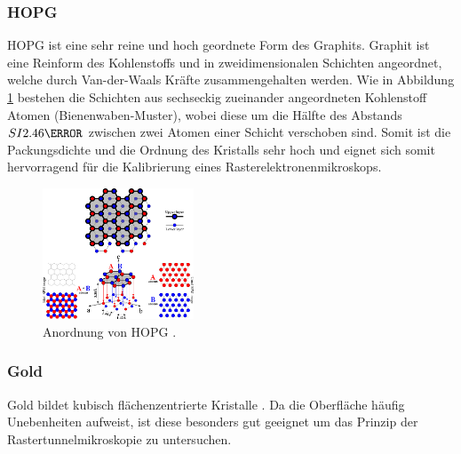 \subsubsection{HOPG} %
\label{ssub:hopg}

HOPG ist eine sehr reine und hoch geordnete Form des Graphits.
Graphit ist eine Reinform des Kohlenstoffs und in zweidimensionalen Schichten angeordnet, welche durch Van-der-Waals Kräfte zusammengehalten werden.
Wie in Abbildung \ref{fig:hopg} bestehen die Schichten aus sechseckig zueinander angeordneten Kohlenstoff Atomen (Bienenwaben-Muster), wobei diese um die Hälfte des Abstands $SI{2.46}{\angstrom}$ zwischen zwei Atomen einer Schicht verschoben sind.
Somit ist die Packungsdichte und die Ordnung des Kristalls sehr hoch und eignet sich somit hervorragend für die Kalibrierung eines Rasterelektronenmikroskops.
\begin{figure}[!h]
    \centering
    \includegraphics[width=0.4\textwidth]{images/hopg.jpg}
    \caption{Anordnung von HOPG \cite{STM-hopg}.}
    \label{fig:hopg}
\end{figure}

\subsubsection{Gold} %
\label{ssub:gold}

Gold bildet kubisch flächenzentrierte Kristalle \cite{STM-gold}.
Da die Oberfläche häufig Unebenheiten aufweist, ist diese besonders gut geeignet um das Prinzip der Rastertunnelmikroskopie zu untersuchen.
